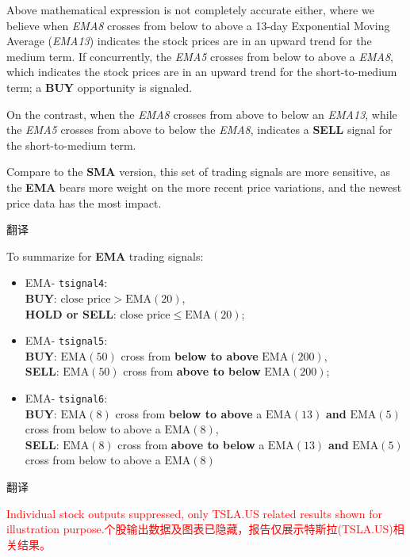 \documentclass[
]{book}
\begin{document}
Above mathematical expression is not completely accurate either, where
we believe when \emph{EMA8} crosses from below to above a 13-day
Exponential Moving Average (\emph{EMA13}) indicates the stock prices are
in an upward trend for the medium term. If concurrently, the \emph{EMA5}
crosses from below to above a \emph{EMA8}, which indicates the stock
prices are in an upward trend for the short-to-medium term; a
\textbf{BUY} opportunity is signaled.

On the contrast, when the \emph{EMA8} crosses from above to below an
\emph{EMA13}, while the \emph{EMA5} crosses from above to below the
\emph{EMA8}, indicates a \textbf{SELL} signal for the short-to-medium
term.

Compare to the \textbf{SMA} version, this set of trading signals are
more sensitive, as the \textbf{EMA} bears more weight on the more recent
price variations, and the newest price data has the most impact.

翻译

To summarize for \textbf{EMA} trading signals:

\begin{itemize}
\item
  EMA- \texttt{tsignal4}:\\
  \textbf{BUY}: \(\text{close price}>\text{EMA}(20)\),\\
  \textbf{HOLD or SELL}: \(\text{close price}\leq \text{EMA}(20)\);
\item
  EMA- \texttt{tsignal5}:\\
  \textbf{BUY}: \(\text{EMA}(50)\) cross from \textbf{below to above}
  \(\text{EMA}(200)\),\\
  \textbf{SELL}: \(\text{EMA}(50)\) cross from \textbf{above to below}
  \(\text{EMA}(200)\);
\item
  EMA- \texttt{tsignal6}:\\
  \textbf{BUY}: \(\text{EMA}(8)\) cross from \textbf{below to above} a
  \(\text{EMA}(13)\) \textbf{and} \(\text{EMA}(5)\) cross from below to
  above a \(\text{EMA}(8)\),\\
  \textbf{SELL}: \(\text{EMA}(8)\) cross from \textbf{above to below} a
  \(\text{EMA}(13)\) \textbf{and} \(\text{EMA}(5)\) cross from below to
  above a \(\text{EMA}(8)\)
\end{itemize}

翻译

\textcolor{red}{Individual stock outputs suppressed, only TSLA.US related results shown for illustration purpose.个股输出数据及图表已隐藏，报告仅展示特斯拉(TSLA.US)相关结果。}
\end{document}
